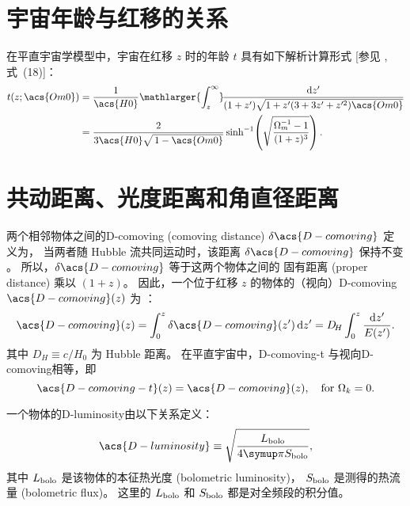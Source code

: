 \section{宇宙年龄与红移的关系}

在平直宇宙学模型中，宇宙在红移 $z$ 时的年龄 $t$ 具有如下解析计算形式
[参见 , 式~(18)]：
\begin{align}
  \label{eq:universe-age}
  t(z; \acs{Om0})
    & = \frac{1}{\acs{H0}} \mathlarger{\int_z^{\infty}}
      \!\frac{\D{z'}}{(1+z')\sqrt{1 + z' (3+3z'+z'^2) \acs{Om0}}}
      \nonumber \\
    & = \frac{2}{3 \acs{H0} \sqrt{\,1-\acs{Om0}}} \sinh^{-1}
      \!\left( \sqrt{\frac{\Omega_m^{-1} - 1}{(1+z)^3}} \right) .
\end{align}


\section{共动距离、光度距离和⻆直径距离}

两个相邻物体之间的\acl{D-comoving} (comoving distance)
$\delta\acs{D-comoving}$ 定义为，
当两者随 Hubble 流共同运动时，该距离 $\delta\acs{D-comoving}$ 保持不变
\cite{hogg1999}。
所以，$\delta\acs{D-comoving}$ 等于这两个物体之间的
固有距离 (proper distance) 乘以 $(1+z)$。
因此，一个位于红移 $z$ 的物体的（视向）\acl{D-comoving}
$\acs{D-comoving}(z)$ 为 \cite{hogg1999}：
\begin{equation}
  \label{eq:distance-comoving}
  \acs{D-comoving}(z)
    = \int_0^z \delta\acs{D-comoving}(z')\,\D{z'}
    = D_{\!H} \int_0^z \frac{\D{z'}}{E(z')} .
\end{equation}
其中 $D_{\!H} \equiv c / H_0$ 为 Hubble 距离。
在平直宇宙中，\acf{D-comoving-t} 与视向\acl{D-comoving}相等，即
\begin{equation}
  \label{eq:distance-comoving-t}
  \acs{D-comoving-t}(z) = \acs{D-comoving}(z) ,
    \quad \text{for } \Omega_k = 0 .
\end{equation}

一个物体的\acf{D-luminosity}由以下关系定义：
\begin{equation}
  \label{eq:dl-def}
  \acs{D-luminosity} \equiv
    \sqrt{\frac{L_{\R{bolo}}}{4\Cpi S_{\R{bolo}}}} ,
\end{equation}
其中 $L_{\mathrm{bolo}}$ 是该物体的本征热光度 (bolometric luminosity)，
$S_{\mathrm{bolo}}$ 是测得的热流量 (bolometric flux)。
这里的 $L_{\mathrm{bolo}}$ 和 $S_{\mathrm{bolo}}$ 都是对全频段的积分值。

